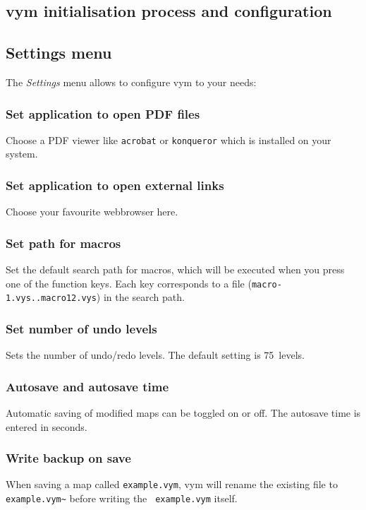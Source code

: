 \documentclass[12pt,a4paper]{article}
\newcommand{\vym}{{\sc vym }}
\begin{document}
\begin{appendix}

\section{\vym initialisation process and configuration}
\subsection {Settings menu}
    The {\em Settings} menu allows to configure \vym to your needs:

\subsubsection*{Set application to open PDF files} Choose a PDF
    viewer like {\tt acrobat} or {\tt konqueror} which is installed on
    your system.

\subsubsection*{Set application to open external links}
    Choose your favourite webbrowser here.

\subsubsection*{Set path for macros}
    Set the default search path for macros, which will be executed when
    you press one of the function keys. Each key corresponds to a file
    ({\tt macro-1.vys..macro12.vys}) in the search path.

\subsubsection*{Set number of undo levels}
    Sets the number of undo/redo levels. The default setting is
    75~levels.

\subsubsection*{Autosave and autosave time}
    Automatic saving of modified maps can be toggled on or off. The
    autosave time is entered in seconds.

\subsubsection*{Write backup on save}
    When saving a map called {\tt example.vym}, \vym will rename the
    existing file to {\tt example.vym\~{}} before writing the {\tt
    example.vym} itself.


\end{appendix}
\end{document}

